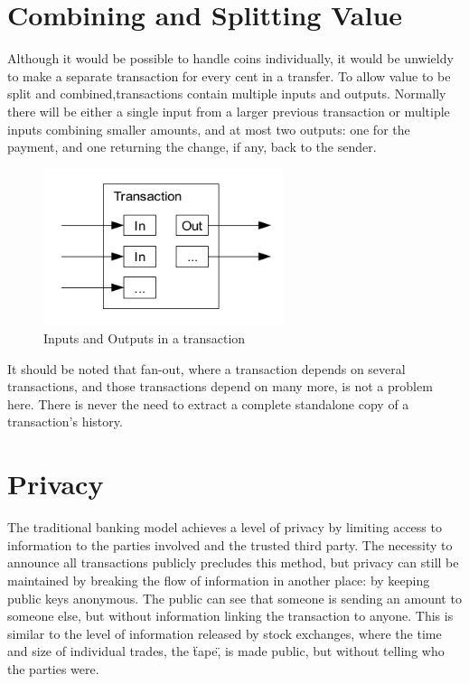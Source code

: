 \section{Combining and Splitting Value}

Although it would be possible to handle coins individually, it would be unwieldy to make a separate transaction for every cent in a transfer. To allow value to be split and combined,transactions contain multiple inputs and outputs. Normally there will be either a single input from a larger previous transaction or multiple inputs combining smaller amounts, and at most two outputs: one for the payment, and one returning the change, if any, back to the sender.

\begin{figure}[ht!]
\centering
\includegraphics[trim = 0mm 0mm 0mm 0mm, width=70mm]{images/multiple_in_outs_transaction}
\caption{Inputs and Outputs in a transaction}
\end{figure}

It should be noted that fan-out, where a transaction depends on several transactions, and those transactions depend on many more, is not a problem here. There is never the need to extract a complete standalone copy of a transaction's history.

\section{Privacy}

The traditional banking model achieves a level of privacy by limiting access to information to the parties involved and the trusted third party. The necessity to announce all transactions publicly precludes this method, but privacy can still be maintained by breaking the flow of information in another place: by keeping public keys anonymous. The public can see that someone is sending an amount to someone else, but without information linking the transaction to anyone. This is similar to the level of information released by stock exchanges, where the time and size of individual trades, the \"tape\", is made public, but without telling who the parties were.

